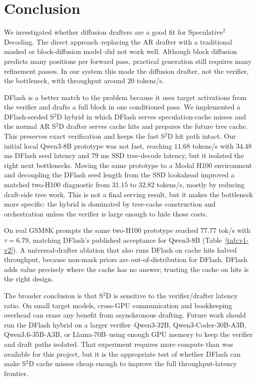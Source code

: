 \section{Conclusion}
\label{sec:conclusion}

We investigated whether diffusion drafters are a good fit for
Speculative$^2$ Decoding. The direct approach--replacing the AR drafter with a
traditional masked or block-diffusion model--did not work well. Although block
diffusion predicts many positions per forward pass, practical generation still
requires many refinement passes. In our system this made the diffusion
drafter, not the verifier, the bottleneck, with throughput around $20$
tokens/s.

DFlash is a better match to the problem because it uses target activations
from the verifier and drafts a full block in one conditioned pass. We
implemented a DFlash-seeded S$^2$D hybrid in which DFlash serves
speculation-cache misses and the normal AR S$^2$D drafter serves cache hits
and prepares the future tree cache. This preserves exact verification and
keeps the fast S$^2$D hit path intact. Our initial local Qwen3-8B prototype
was not fast, reaching $11.68$ tokens/s with $34.48$ ms DFlash seed latency
and $79$ ms SSD tree-decode latency, but it isolated the right next
bottlenecks.
Moving the same prototype to a Modal H100 environment and decoupling the
DFlash seed length from the SSD lookahead improved a matched two-H100
diagnostic from $31.15$ to $32.82$ tokens/s, mostly by reducing draft-side
tree work. This is not a final serving result, but it makes the bottleneck
more specific: the hybrid is dominated by tree-cache construction and
orchestration unless the verifier is large enough to hide those costs.

On real GSM8K prompts the same two-H100 prototype reached $77.77$ tok/s with
$\tau{=}6.79$, matching DFlash's published acceptance for Qwen3-8B
(Table~\ref{tab:v1-v2}). A universal-drafter ablation that also runs DFlash
on cache hits halved throughput, because non-mask priors are
out-of-distribution for DFlash. DFlash adds value precisely where the cache
has no answer; trusting the cache on hits is the right design.

The broader conclusion is that S$^2$D is sensitive to the verifier/drafter
latency ratio. On small target models, cross-GPU communication and
bookkeeping overhead can erase any benefit from asynchronous drafting. Future
work should run the DFlash hybrid on a larger verifier--Qwen3-32B,
Qwen3-Coder-30B-A3B, Qwen3.6-35B-A3B, or Llama-70B--using enough GPU memory
to keep the verifier and draft paths isolated. That experiment requires more
compute than was available for this project, but it is the appropriate test of
whether DFlash can make S$^2$D cache misses cheap enough to improve the full
throughput-latency frontier.
